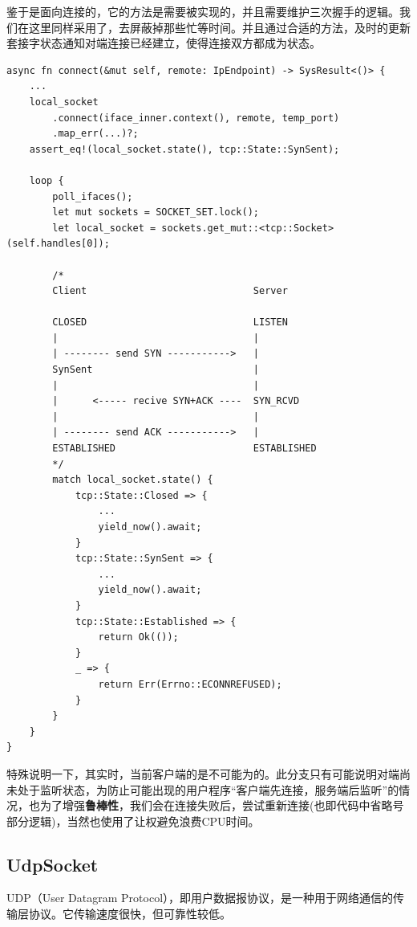 \documentclass{article}
\begin{document}
鉴于是面向连接的，它的方法是需要被实现的，并且需要维护三次握手的逻辑。我们在这里同样采用了，去屏蔽掉那些忙等时间。并且通过合适的方法，及时的更新套接字状态通知对端连接已经建立，使得连接双方都成为状态。

\begin{lstlisting}
async fn connect(&mut self, remote: IpEndpoint) -> SysResult<()> {
    ...
    local_socket
        .connect(iface_inner.context(), remote, temp_port)
        .map_err(...)?;
    assert_eq!(local_socket.state(), tcp::State::SynSent);
    
    loop {
        poll_ifaces();
        let mut sockets = SOCKET_SET.lock();
        let local_socket = sockets.get_mut::<tcp::Socket>(self.handles[0]);

        /*
        Client                             Server

        CLOSED                             LISTEN
        |                                  |
        | -------- send SYN ----------->   |
        SynSent                            |
        |                                  |
        |      <----- recive SYN+ACK ----  SYN_RCVD
        |                                  |
        | -------- send ACK ----------->   |
        ESTABLISHED                        ESTABLISHED
        */
        match local_socket.state() {
            tcp::State::Closed => {
                ...
                yield_now().await;
            }
            tcp::State::SynSent => {
                ...
                yield_now().await;
            }
            tcp::State::Established => {
                return Ok(());
            }
            _ => {
                return Err(Errno::ECONNREFUSED);
            }
        }
    }
}
\end{lstlisting}

特殊说明一下，其实时，当前客户端的是不可能为的。此分支只有可能说明对端尚未处于监听状态，为防止可能出现的用户程序“客户端先连接，服务端后监听”的情况，也为了增强\textbf{鲁棒性}，我们会在连接失败后，尝试重新连接(也即代码中省略号部分逻辑)，当然也使用了让权避免浪费CPU时间。

\subsection{UdpSocket}
UDP（User Datagram Protocol），即用户数据报协议，是一种用于网络通信的传输层协议。它传输速度很快，但可靠性较低。
\end{document}
